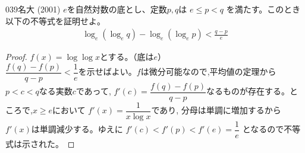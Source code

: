 \begin{prob}{039}{}{名大 (2001)}
 $e$を自然対数の底とし、定数$p,q$は $e\le p<q$ を満たす。このとき以下の不等式を証明せよ。
 \begin{align*}
  \log_e\left(\log_e q\right) - \log_e\left(\log_e p\right) < \frac{q-p}{e}
 \end{align*}
\end{prob}
\begin{proof}
$f(x)=\log{\log{x}}$とする。（底は$e$）\\
$\dfrac{f(q)-f(p)}{q-p}<\dfrac{1}{e}$を示せばよい。$f$は微分可能なので,平均値の定理から$p<c<q$なる実数$c$であって, $f'(c)=\dfrac{f(q)-f(p)}{q-p}$なるものが存在する。ところで,$x\geq e$において $f'(x)=\dfrac{1}{x\log{x}}$であり, 分母は単調に増加するから$f'(x)$は単調減少する。ゆえに $f'(c)<f'(p)<f'(e)=\dfrac{1}{e}$ となるので不等式は示された。
\end{proof}

